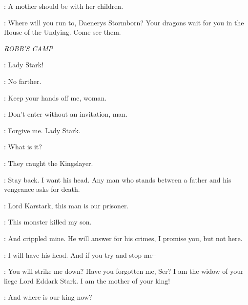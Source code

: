 
\PYAT: A mother should be with her children.


\PYAT: Where will you run to, Daenerys Stormborn? Your dragons wait for you in the House of the Undying. Come see them.



\scene

\textit{ROBB'S CAMP}


\JACKS: Lady Stark!

\BRIENNE: No farther.

\JACKS: Keep your hands off me, woman.

\BRIENNE: Don't enter without an invitation, man.

\JACKS: Forgive me. Lady Stark.

\BRIENNE: What is it?

\JACKS: They caught the Kingslayer.



\KARSTARK: Stay back. I want his head. Any man who stands between a father and his vengeance asks for death.


\CATELYN: Lord Karstark, this man is our prisoner.

\KARSTARK: This monster killed my son.

\CATELYN: And crippled mine. He will answer for his crimes, I promise you, but not here.

\KARSTARK: I will have his head. And if you try and stop me--

\CATELYN: You will strike me down? Have you forgotten me, Ser? I am the widow of your liege Lord Eddark Stark. I am the mother of your king!

\KARSTARK: And where is our king now?

